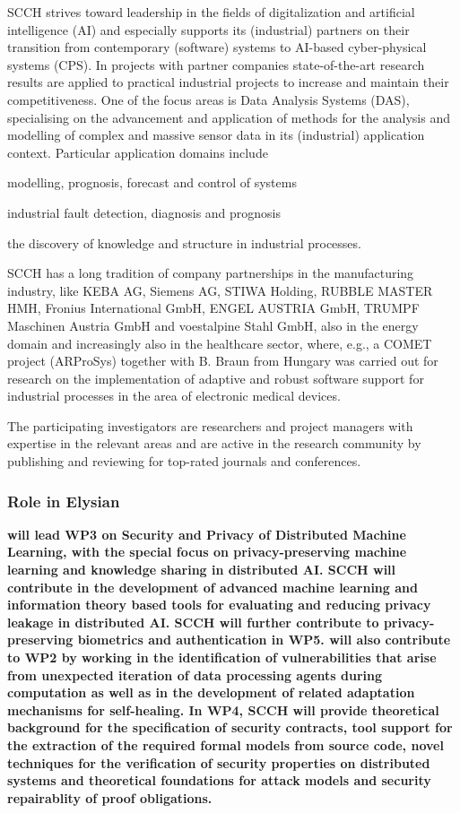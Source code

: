 \documentclass[a4paper,11pt]{article}
\begin{document}
SCCH strives toward leadership in the fields of digitalization and artificial intelligence (AI) and especially supports its (industrial) partners on their transition from contemporary (software) systems to AI-based cyber-physical systems (CPS). In projects with partner companies state-of-the-art research results are applied to practical industrial projects to increase and maintain their competitiveness. One of the focus areas is Data Analysis Systems (DAS), specialising on the advancement and application of methods for the analysis and modelling of complex and massive sensor data in its (industrial) application context. Particular application domains include
\begin{inparaenum}[a)]
\item modelling, prognosis, forecast and control of systems
\item industrial fault detection, diagnosis and prognosis
\item the discovery of knowledge and structure in industrial processes.
\end{inparaenum}
SCCH has a long tradition of company partnerships in the manufacturing industry, like KEBA AG, Siemens AG, STIWA Holding, RUBBLE MASTER HMH, Fronius International GmbH, ENGEL AUSTRIA GmbH, TRUMPF Maschinen Austria GmbH and voestalpine Stahl GmbH, also in the energy domain and increasingly also in the healthcare sector, where, e.g., a COMET project (ARProSys) together with B. Braun from Hungary was carried out for research on the implementation of adaptive and robust software support for industrial processes in the area of electronic medical devices. 

The participating investigators are researchers and project managers with expertise in the relevant areas and are active in the research community by publishing and reviewing for top-rated journals and conferences.

\vspace{10pt}
\subsubsection*{Role in Elysian}
\textbf{\SCCH{} will lead WP3 on Security and Privacy of Distributed Machine Learning, with the special focus on privacy-preserving machine learning and knowledge sharing in distributed AI. SCCH will contribute in the development of advanced machine learning and information theory based tools for evaluating and reducing privacy leakage in distributed AI. SCCH will further contribute to privacy-preserving biometrics and authentication in WP5. \SCCH{} will also contribute to WP2 by working in the identification of vulnerabilities that arise from unexpected iteration of data processing agents during computation as well as in the development of related adaptation mechanisms for self-healing. In WP4, SCCH will provide theoretical background for the specification of security contracts, tool support for the extraction of the required formal models from source code, novel techniques for the verification of security properties on distributed systems and theoretical foundations for attack models and security repairablity of proof obligations.}
\vspace{10pt}
\end{document}

